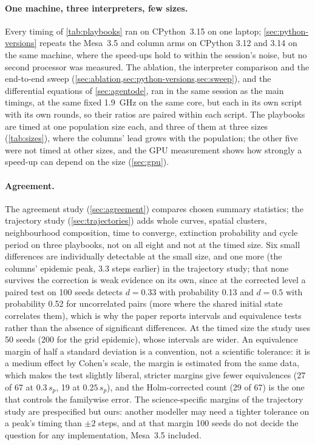 \paragraph{One machine, three interpreters, few sizes.} Every timing of \cref{tab:playbooks}
ran on CPython~3.15 on one laptop; \cref{sec:python-versions} repeats the Mesa~3.5 and
column arms on CPython 3.12 and 3.14 on the same machine, where the speed-ups hold to
within the session's noise, but no second processor was measured. The ablation, the
interpreter comparison and the end-to-end sweep (\cref{sec:ablation,sec:python-versions,sec:sweep}),
and the differential equations of \cref{sec:agentode}, ran in the same
session as the main timings, at the same fixed 1.9~GHz on the same core, but each in its own
script with its own rounds, so their ratios are paired within each script. The playbooks are timed
at one population size each, and three of them at three sizes (\cref{tab:sizes}), where the
columns' lead grows with the population; the other five were not timed at other sizes, and
the GPU measurement shows how strongly a speed-up can depend on the size (\cref{sec:gpu}).

\paragraph{Agreement.} The agreement study (\cref{sec:agreement}) compares chosen summary
statistics; the trajectory study (\cref{sec:trajectories}) adds whole curves, spatial
clusters, neighbourhood composition, time to converge, extinction probability and cycle
period on three playbooks, not on all eight and not at the timed size. Six small
differences are individually detectable at the small size, and one more (the columns'
epidemic peak, 3.3 steps earlier) in the trajectory study; that none survives the
correction is weak evidence on its own, since at the corrected level a paired test on 100
seeds detects $d = 0.33$ with probability 0.13 and $d = 0.5$ with probability 0.52 for
uncorrelated pairs (more where the shared initial state correlates them), which is why
the paper reports intervals and equivalence tests rather than the absence of significant
differences. At the timed size the study uses 50 seeds (200 for the grid epidemic), whose
intervals are wider. An equivalence margin of half a standard deviation is a convention,
not a scientific tolerance: it is a medium effect by Cohen's scale, the margin is estimated
from the same data, which makes the test slightly liberal, stricter margins give fewer
equivalences (27 of 67 at $0.3\,s_p$, 19 at $0.25\,s_p$), and the Holm-corrected count
(29 of 67) is the one that controls the familywise error. The science-specific margins of
the trajectory study are prespecified but ours: another modeller may need a tighter
tolerance on a peak's timing than $\pm 2$ steps, and at that margin 100 seeds do not
decide the question for any implementation, Mesa~3.5 included.

